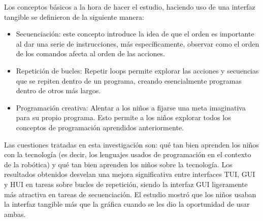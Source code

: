 Los conceptos básicos a la hora de hacer el estudio, haciendo uso de una interfaz tangible se definieron de la siguiente manera:
\begin{itemize}
\item Secuenciación: este concepto introduce la idea de que el orden es importante al dar una serie de instrucciones, más específicamente, observar como el orden de los comandos afecta al orden de las acciones.
\item Repetición de bucles: Repetir loops permite explorar las acciones y secuencias que se repiten dentro de un programa, creando esencialmente programas dentro de otros más largos.
\item Programación creativa: Alentar a los niños a fijarse una meta imaginativa para su propio programa. Esto permite a los niños explorar todos los conceptos de programación aprendidos anteriormente.
\end{itemize}

Las cuestiones tratadas en esta investigación son: qué tan bien aprenden los niños con la tecnología (es decir, los lenguajes usados de programación en el contexto de la robótica) y qué tan bien aprenden los niños sobre la tecnología.
Los resultados obtenidos desvelan una mejora significativa entre interfaces TUI, GUI y HUI en tareas sobre bucles de repetición, siendo la interfaz GUI ligeramente más atractiva en tareas de secuenciación.
El estudio mostró que los niños usaban la interfaz tangible más que la gráfica cuando se les dio la oportunidad de usar ambas.


